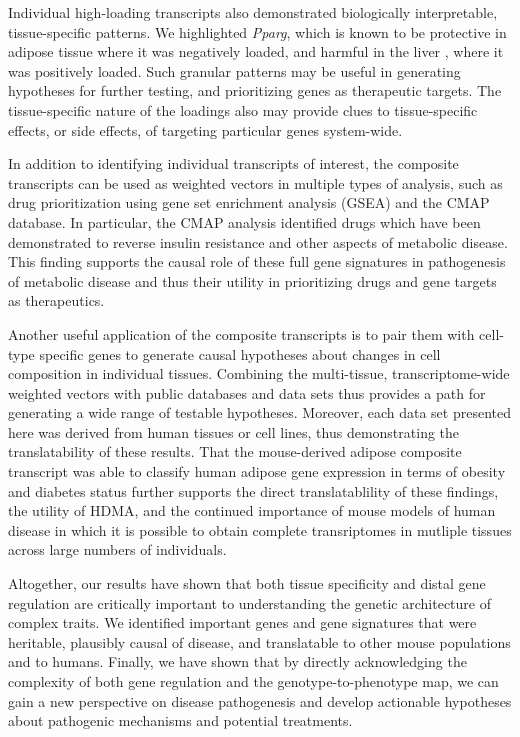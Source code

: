 \documentclass[
]{article}
\begin{document}
Individual high-loading transcripts also demonstrated biologically
interpretable, tissue-specific patterns. We highlighted \textit{Pparg},
which is known to be protective in adipose tissue \cite{pmid17389767}
where it was negatively loaded, and harmful in the liver
\cite{pmid12805374, pmid12618528, 
pmid16357043, pmid15644454, pmid16403437}, where it was positively
loaded. Such granular patterns may be useful in generating hypotheses
for further testing, and prioritizing genes as therapeutic targets. The
tissue-specific nature of the loadings also may provide clues to
tissue-specific effects, or side effects, of targeting particular genes
system-wide.

In addition to identifying individual transcripts of interest, the
composite transcripts can be used as weighted vectors in multiple types
of analysis, such as drug prioritization using gene set enrichment
analysis (GSEA) and the CMAP database. In particular, the CMAP analysis
identified drugs which have been demonstrated to reverse insulin
resistance and other aspects of metabolic disease. This finding supports
the causal role of these full gene signatures in pathogenesis of
metabolic disease and thus their utility in prioritizing drugs and gene
targets as therapeutics.

Another useful application of the composite transcripts is to pair them
with cell-type specific genes to generate causal hypotheses about
changes in cell composition in individual tissues. Combining the
multi-tissue, transcriptome-wide weighted vectors with public databases
and data sets thus provides a path for generating a wide range of
testable hypotheses. Moreover, each data set presented here was derived
from human tissues or cell lines, thus demonstrating the translatability
of these results. That the mouse-derived adipose composite transcript
was able to classify human adipose gene expression in terms of obesity
and diabetes status further supports the direct translatablility of
these findings, the utility of HDMA, and the continued importance of
mouse models of human disease in which it is possible to obtain complete
transriptomes in mutliple tissues across large numbers of individuals.

Altogether, our results have shown that both tissue specificity and
distal gene regulation are critically important to understanding the
genetic architecture of complex traits. We identified important genes
and gene signatures that were heritable, plausibly causal of disease,
and translatable to other mouse populations and to humans. Finally, we
have shown that by directly acknowledging the complexity of both gene
regulation and the genotype-to-phenotype map, we can gain a new
perspective on disease pathogenesis and develop actionable hypotheses
about pathogenic mechanisms and potential treatments.
\end{document}
